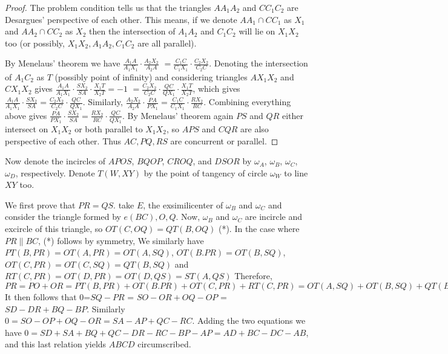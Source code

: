 \documentclass[11pt,a4paper]{article}
\begin{document}
\begin{enumerate}
\begin{proof}
	The problem condition tells us that the triangles $AA_1A_2$ and $CC_1C_2$ are Desargues' perspective of each other. 
	This means, if we denote $AA_1\cap CC_1$ as $X_1$ and $AA_2\cap CC_2$ as $X_2$ then the intersection of $A_1A_2$ and $C_1C_2$ will lie on $X_1X_2$ too (or possibly, $X_1X_2, A_1A_2, C_1C_2$ are all parallel). 
	
	By Menelaus' theorem we have $\frac{A_1A}{A_1X_1}\cdot\frac{A_2X_2}{A_2A}$
	$=\frac{C_1C}{C_1X_1}\cdot\frac{C_2X_2}{C_2C}$. 
	Denoting the intersection of $A_1C_2$ as $T$ (possibly point of infinity) and considering triangles $AX_1X_2$ and $CX_1X_2$ gives
	$\frac{A_1A}{A_1X_1}\cdot\frac{SX_2}{SA}\cdot\frac{X_1T}{X_2T}=-1$
	$=\frac{C_2X_2}{C_2C}\cdot\frac{QC}{QX_1}\cdot\frac{X_1T}{X_2T}$, 
	which gives 
	$\frac{A_1A}{A_1X_1}\cdot\frac{SX_2}{SA}=\frac{C_2X_2}{C_2C}\cdot\frac{QC}{QX_1}$. 
	Similarly, $\frac{A_2X_2}{A_2A}\cdot\frac{PA}{PX_1}=\frac{C_1C}{C_1X_1}\cdot\frac{RX_2}{RC}$. 
	Combining everything above gives 
	$\frac{PA}{PX_1}\cdot\frac{SX_2}{SA}=\frac{RX_2}{RC}\cdot\frac{QC}{QX_1}$. 
	By Menelaus' theorem again $PS$ and $QR$ either intersect on $X_1X_2$ or both parallel to $X_1X_2$, so $APS$ and $CQR$ are also perspective of each other. 
	Thus $AC, PQ, RS$ are concurrent or parallel. 
\end{proof}

Now denote the incircles of  $APOS$, $BQOP$, $CROQ$, and $DSOR$ by $\omega_A$, $\omega_B$, $\omega_C$, $\omega_D$, respectively. Denote $T(W, XY)$ by the point of tangency of circle $\omega_W$ to line $XY$ too.

We first prove that $PR=QS$. take $E$, the exsimilicenter of $\omega_B$ and $\omega_C$ and consider the triangle formed by $e(BC), O, Q$. Now, $\omega_B$ and $\omega_C$ are incircle and excircle of this triangle, so $OT(C, OQ)=QT(B,OQ)$ (*). 
In the case where $PR\parallel BC$, (*) follows by symmetry, We similarly have $PT(B,PR)=OT(A,PR)=OT(A,SQ)$, $OT(B.PR)=OT(B,SQ)$, $OT(C,PR)=OT(C,SQ)=QT(B,SQ)$ and $RT(C,PR)=OT(D,PR)=OT(D,QS)=ST(A,QS)$ Therefore, $PR=PO+OR=PT(B,PR)+OT(B.PR)+OT(C,PR)+RT(C,PR)=OT(A,SQ)+OT(B,SQ)+QT(B,SQ)+ST(A,QS)=SO+OQ=QS.$ It then follows that 0=$SQ-PR$ = $SO-OR+OQ-OP$ = $SD-DR+BQ-BP.$ Similarly $0=SO-OP+OQ-OR=SA-AP+QC-RC$. Adding the two equations we have $0=SD+SA+BQ+QC-DR-RC-BP-AP=AD+BC-DC-AB$, and this last relation yields $ABCD$ circumscribed.


\end{enumerate}
\end{document}
